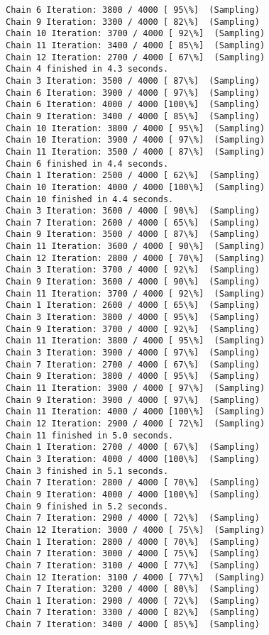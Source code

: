 \documentclass[11pt]{article}
\begin{document}
\begin{Verbatim}[commandchars=\\\{\}]
Chain 6 Iteration: 3800 / 4000 [ 95\%]  (Sampling)
Chain 9 Iteration: 3300 / 4000 [ 82\%]  (Sampling)
Chain 10 Iteration: 3700 / 4000 [ 92\%]  (Sampling)
Chain 11 Iteration: 3400 / 4000 [ 85\%]  (Sampling)
Chain 12 Iteration: 2700 / 4000 [ 67\%]  (Sampling)
Chain 4 finished in 4.3 seconds.
Chain 3 Iteration: 3500 / 4000 [ 87\%]  (Sampling)
Chain 6 Iteration: 3900 / 4000 [ 97\%]  (Sampling)
Chain 6 Iteration: 4000 / 4000 [100\%]  (Sampling)
Chain 9 Iteration: 3400 / 4000 [ 85\%]  (Sampling)
Chain 10 Iteration: 3800 / 4000 [ 95\%]  (Sampling)
Chain 10 Iteration: 3900 / 4000 [ 97\%]  (Sampling)
Chain 11 Iteration: 3500 / 4000 [ 87\%]  (Sampling)
Chain 6 finished in 4.4 seconds.
Chain 1 Iteration: 2500 / 4000 [ 62\%]  (Sampling)
Chain 10 Iteration: 4000 / 4000 [100\%]  (Sampling)
Chain 10 finished in 4.4 seconds.
Chain 3 Iteration: 3600 / 4000 [ 90\%]  (Sampling)
Chain 7 Iteration: 2600 / 4000 [ 65\%]  (Sampling)
Chain 9 Iteration: 3500 / 4000 [ 87\%]  (Sampling)
Chain 11 Iteration: 3600 / 4000 [ 90\%]  (Sampling)
Chain 12 Iteration: 2800 / 4000 [ 70\%]  (Sampling)
Chain 3 Iteration: 3700 / 4000 [ 92\%]  (Sampling)
Chain 9 Iteration: 3600 / 4000 [ 90\%]  (Sampling)
Chain 11 Iteration: 3700 / 4000 [ 92\%]  (Sampling)
Chain 1 Iteration: 2600 / 4000 [ 65\%]  (Sampling)
Chain 3 Iteration: 3800 / 4000 [ 95\%]  (Sampling)
Chain 9 Iteration: 3700 / 4000 [ 92\%]  (Sampling)
Chain 11 Iteration: 3800 / 4000 [ 95\%]  (Sampling)
Chain 3 Iteration: 3900 / 4000 [ 97\%]  (Sampling)
Chain 7 Iteration: 2700 / 4000 [ 67\%]  (Sampling)
Chain 9 Iteration: 3800 / 4000 [ 95\%]  (Sampling)
Chain 11 Iteration: 3900 / 4000 [ 97\%]  (Sampling)
Chain 9 Iteration: 3900 / 4000 [ 97\%]  (Sampling)
Chain 11 Iteration: 4000 / 4000 [100\%]  (Sampling)
Chain 12 Iteration: 2900 / 4000 [ 72\%]  (Sampling)
Chain 11 finished in 5.0 seconds.
Chain 1 Iteration: 2700 / 4000 [ 67\%]  (Sampling)
Chain 3 Iteration: 4000 / 4000 [100\%]  (Sampling)
Chain 3 finished in 5.1 seconds.
Chain 7 Iteration: 2800 / 4000 [ 70\%]  (Sampling)
Chain 9 Iteration: 4000 / 4000 [100\%]  (Sampling)
Chain 9 finished in 5.2 seconds.
Chain 7 Iteration: 2900 / 4000 [ 72\%]  (Sampling)
Chain 12 Iteration: 3000 / 4000 [ 75\%]  (Sampling)
Chain 1 Iteration: 2800 / 4000 [ 70\%]  (Sampling)
Chain 7 Iteration: 3000 / 4000 [ 75\%]  (Sampling)
Chain 7 Iteration: 3100 / 4000 [ 77\%]  (Sampling)
Chain 12 Iteration: 3100 / 4000 [ 77\%]  (Sampling)
Chain 7 Iteration: 3200 / 4000 [ 80\%]  (Sampling)
Chain 1 Iteration: 2900 / 4000 [ 72\%]  (Sampling)
Chain 7 Iteration: 3300 / 4000 [ 82\%]  (Sampling)
Chain 7 Iteration: 3400 / 4000 [ 85\%]  (Sampling)

\end{Verbatim}
\end{document}
